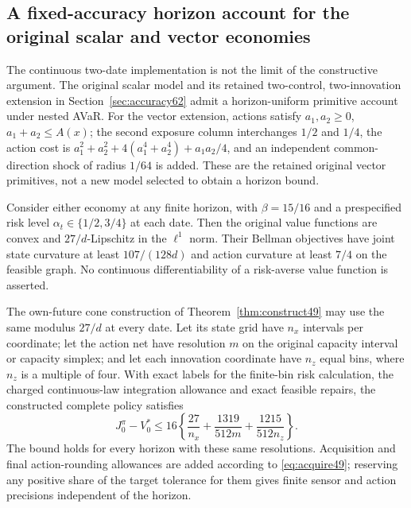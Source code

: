 \subsection{A fixed-accuracy horizon account for the original scalar and vector economies}\label{sec:horizon95}
The continuous two-date implementation is not the limit of the constructive argument. The original scalar model and its retained two-control, two-innovation extension in Section~\ref{sec:accuracy62} admit a horizon-uniform primitive account under nested AVaR. For the vector extension, actions satisfy $a_1,a_2\geq0$, $a_1+a_2\leq A(x)$; the second exposure column interchanges $1/2$ and $1/4$, the action cost is $a_1^2+a_2^2+4(a_1^4+a_2^4)+a_1a_2/4$, and an independent common-direction shock of radius $1/64$ is added. These are the retained original vector primitives, not a new model selected to obtain a horizon bound.

\begin{proposition}\label{prop:horizon95}
Consider either economy at any finite horizon, with $\beta=15/16$ and a prespecified risk level $\alpha_t\in\{1/2,3/4\}$ at each date. Then the original value functions are convex and $27/d$-Lipschitz in the $\ell^1$ norm. Their Bellman objectives have joint state curvature at least $107/(128d)$ and action curvature at least $7/4$ on the feasible graph. No continuous differentiability of a risk-averse value function is asserted.

The own-future cone construction of Theorem~\ref{thm:construct49} may use the same modulus $27/d$ at every date. Let its state grid have $n_x$ intervals per coordinate; let the action net have resolution $m$ on the original capacity interval or capacity simplex; and let each innovation coordinate have $n_z$ equal bins, where $n_z$ is a multiple of four. With exact labels for the finite-bin risk calculation, the charged continuous-law integration allowance and exact feasible repairs, the constructed complete policy satisfies
\begin{equation}\label{eq:uniformhorizon95}
 J_0^\pi-V_0^*\leq16\left\{\frac{27}{n_x}
             +\frac{1319}{512m}+\frac{1215}{512n_z}\right\}.
\end{equation}
The bound holds for every horizon with these same resolutions. Acquisition and final action-rounding allowances are added according to \eqref{eq:acquire49}; reserving any positive share of the target tolerance for them gives finite sensor and action precisions independent of the horizon.
\end{proposition}

